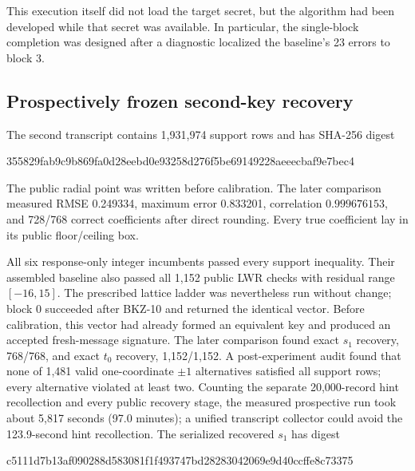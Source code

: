 \documentclass[11pt,a4paper]{article}
\newcommand{\ProspectiveRows}{1{,}931{,}974}
\newcommand{\ProspectiveRadialRMSE}{0.249334}
\newcommand{\ProspectiveRadialMaxError}{0.833201}
\newcommand{\ProspectiveRoundedExact}{728}
\newcommand{\ProspectiveRecoveryHash}{c5111d7b13af090288d583081f1f493747bd28283042069e9d40ccffe8c73375}
\newcommand{\ProspectiveTranscriptHash}{355829fab9c9b869fa0d28eebd0e93258d276f5be69149228aeeecbaf9e7bec4}
\begin{document}
This execution itself did not load the target secret, but the algorithm had
been developed while that secret was available.  In particular, the
single-block completion was designed after a diagnostic localized the
baseline's 23 errors to block 3.

\subsection{Prospectively frozen second-key recovery}

The second transcript contains \ProspectiveRows{} support rows and has
SHA-256 digest
\begin{center}
{\ttfamily\scriptsize \ProspectiveTranscriptHash}
\end{center}
The public radial point was written before calibration.  The later comparison
measured RMSE \ProspectiveRadialRMSE{}, maximum error
\ProspectiveRadialMaxError{}, correlation $0.999676153$, and
\ProspectiveRoundedExact{}/768 correct coefficients after direct rounding.
Every true coefficient lay in its public floor/ceiling box.

All six response-only integer incumbents passed every support inequality.
Their assembled baseline also passed all 1,152 public LWR checks with residual
range $[-16,15]$.  The prescribed lattice ladder was nevertheless run without
change; block 0 succeeded after BKZ-10 and returned the identical vector.
Before calibration, this vector had already formed an equivalent key and
produced an accepted fresh-message signature.  The later comparison found
exact $s_1$ recovery, 768/768, and exact $t_0$ recovery, 1,152/1,152.  A
post-experiment audit found that none of 1,481 valid one-coordinate $\pm1$
alternatives satisfied all support rows; every alternative violated at least
two.  Counting the separate 20,000-record hint recollection and every public
recovery stage, the measured prospective run took about 5,817 seconds
(97.0 minutes); a unified transcript collector could avoid the 123.9-second
hint recollection.  The serialized recovered $s_1$ has digest
\begin{center}
{\ttfamily\scriptsize \ProspectiveRecoveryHash}
\end{center}
\end{document}
